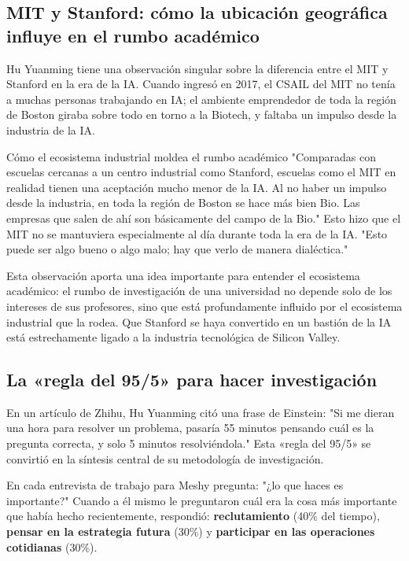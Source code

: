 \subsection{MIT y Stanford: cómo la ubicación geográfica influye en el rumbo académico}

Hu Yuanming tiene una observación singular sobre la diferencia entre el MIT y Stanford en la era de la IA. Cuando ingresó en 2017, el CSAIL del MIT no tenía a muchas personas trabajando en IA; el ambiente emprendedor de toda la región de Boston giraba sobre todo en torno a la Biotech, y faltaba un impulso desde la industria de la IA.

\begin{knowledgebox}{Cómo el ecosistema industrial moldea el rumbo académico}
"Comparadas con escuelas cercanas a un centro industrial como Stanford, escuelas como el MIT en realidad tienen una aceptación mucho menor de la IA. Al no haber un impulso desde la industria, en toda la región de Boston se hace más bien Bio. Las empresas que salen de ahí son básicamente del campo de la Bio." Esto hizo que el MIT no se mantuviera especialmente al día durante toda la era de la IA. "Esto puede ser algo bueno o algo malo; hay que verlo de manera dialéctica."
\end{knowledgebox}

Esta observación aporta una idea importante para entender el ecosistema académico: el rumbo de investigación de una universidad no depende solo de los intereses de sus profesores, sino que está profundamente influido por el ecosistema industrial que la rodea. Que Stanford se haya convertido en un bastión de la IA está estrechamente ligado a la industria tecnológica de Silicon Valley.

\subsection{La «regla del 95/5» para hacer investigación}

En un artículo de Zhihu, Hu Yuanming citó una frase de Einstein: "Si me dieran una hora para resolver un problema, pasaría 55 minutos pensando cuál es la pregunta correcta, y solo 5 minutos resolviéndola." Esta «regla del 95/5» se convirtió en la síntesis central de su metodología de investigación.

En cada entrevista de trabajo para Meshy pregunta: "¿lo que haces es importante?" Cuando a él mismo le preguntaron cuál era la cosa más importante que había hecho recientemente, respondió: \textbf{reclutamiento} (40\% del tiempo), \textbf{pensar en la estrategia futura} (30\%) y \textbf{participar en las operaciones cotidianas} (30\%).


